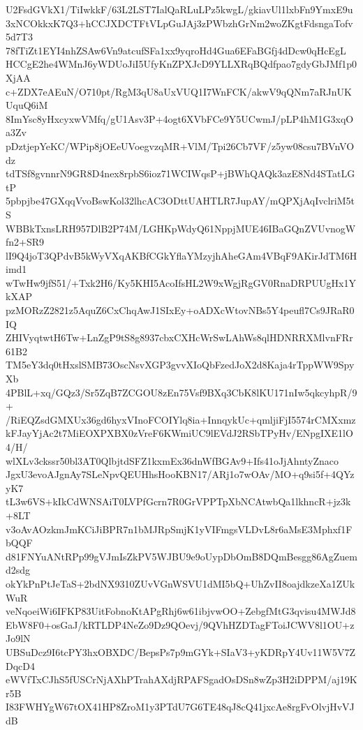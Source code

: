 U2FsdGVkX1/TiIwkkF/63L2LST7IalQaRLuLPz5kwgL/gkiavUl1lxbFn9YmxE9u
3xNCOkkxK7Q3+hCCJXDCTFtVLpGuJAj3zPWbzhGrNm2woZKgtFdsngaTofv5d7T3
78fTiZt1EYI4nhZSAw6Vn9atcufSFa1xx9yqroHd4Gua6EFaBGfj4dDcw0qHcEgL
HCCgE2he4WMnJ6yWDUoJiI5UfyKnZPXJcD9YLLXRqBQdfpao7gdyGbJMf1p0XjAA
c+ZDX7eAEuN/O710pt/RgM3qU8aUxVUQ1I7WnFCK/akwV9qQNm7aRJnUKUquQ6iM
8ImYsc8yHxcyxwVMfq/gU1Asv3P+4ogt6XVbFCe9Y5UCwmJ/pLP4hM1G3xqOa3Zv
pDztjepYeKC/WPip8jOEeUVoegvzqMR+VlM/Tpi26Cb7VF/z5yw08csu7BVnVOdz
tdTSf8gvnnrN9GR8D4nex8rpbS6ioz71WCIWqsP+jBWhQAQk3azE8Nd4STatLGtP
5pbpjbe47GXqqVvoBswKol32lhcAC3ODttUAHTLR7JupAY/mQPXjAqIvclriM5tS
WBBkTxnsLRH957DlB2P74M/LGHKpWdyQ61NppjMUE46IBaGQnZVUvnogWfn2+SR9
lI9Q4joT3QPdvB5kWyVXqAKBfCGkYflaYMzyjhAheGAm4VBqF9AKirJdTM6Himd1
wTwHw9jfS51/+Txk2H6/Ky5KHI5AcoIfsHL2W9xWgjRgGV0RnaDRPUUgHx1YkXAP
pzMORzZ2821z5AquZ6CxChqAwJ1SIxEy+oADXcWtovNBs5Y4peufl7Cs9JRaR0IQ
ZHIVyqtwtH6Tw+LnZgP9tS8g8937cbxCXHcWrSwLAhWs8qlHDNRRXMlvnFRr61B2
TM5eY3dq0tHxslSMB73OscNsvXGP3gvvXIoQbFzedJoX2d8Kaja4rTppWW9SpyXb
4PBlL+xq/GQz3/Sr5ZqB7ZCGOU8zEn75Vsf9BXq3CbK8lKU171nIw5qkcyhpR/9+
/RiEQZsdGMXUx36gd6hyxVInoFCOIYlq8ia+InnqykUc+qmljiFjI5574rCMXxmz
kFJayYjAc2t7MiEOXPXBX0zVreF6KWmiUC9lEVdJ2RSbTPyHv/ENpgIXE1lO4/H/
wlXLv3ckssr50bl3AT0QlbjtdSFZ1kxmEx36dnWfBGAv9+Ifs41oJjAhntyZnaco
JgxU3evoAJgnAy7SLeNpvQEUHhsHooKBN17/ARj1o7wOAv/MO+q9si5f+4QYzyK7
tL3w6VS+kIkCdWNSAiT0LVPfGcrn7R0GrVPPTpXbNCAtwbQa1lkhncR+jz3k+8LT
v3oAvAOzkmJmKCiJiBPR7n1bMJRpSmjK1yVIFmgsVLDvL8r6aMsE3Mphxf1FbQQF
d81FNYuANtRPp99gVJmIsZkPV5WJBU9e9oUypDbOmB8DQmBesgg86AgZuemd2sdg
okYkPnPtJeTaS+2bdNX9310ZUvVGnWSVU1dMI5bQ+UhZvII8oajdkzeXa1ZUkWuR
veNqoeiWi6IFKP83UitFobnoKtAPgRhj6w61ibjvwOO+ZebgfMtG3qvisu4MWJd8
EbW8F0+osGaJ/kRTLDP4NeZo9Dz9QOevj/9QVhHZDTagFToiJCWV8l1OU+zJo9lN
UBSuDcz9I6tcPY3hxOBXDC/BepsPs7p9mGYk+SIaV3+yKDRpY4Uv11W5V7ZDqcD4
eWVfTxCJhS5fUSCrNjAXhPTrahAXdjRPAFSgadOsDSn8wZp3H2iDPPM/aj19Kr5B
I83FWHYgW67tOX41HP8ZroM1y3PTdU7G6TE48qJ8cQ41jxcAe8rgFvOlvjHvVJdB
